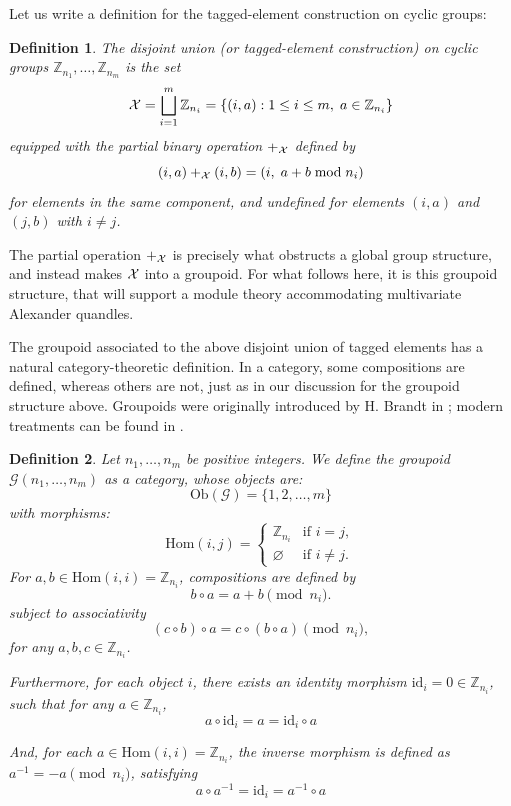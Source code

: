 \documentclass[a4paper,12pt]{article}
\newtheorem{definition}{Definition}[section]
\newcommand{\Z}{\mathbb{Z}}
\newcommand{\calG}{\mathcal{G}}
\newcommand{\Ob}{\mathrm{Ob}}
\newcommand{\Hom}{\mathrm{Hom}}
\begin{document}
Let us write a definition for the tagged-element construction on cyclic groups:   
\begin{definition}
The \emph{disjoint union} (or tagged-element construction) on cyclic groups
$\Z_{n_1}, \ldots, \Z_{n_m}$ is the set
\[
  {\cal X} = \bigsqcup_{i=1}^{m} \Z_{n_i} = \{(i,a) : 1 \le i \le m,\; a \in \Z_{n_i}\}
\]
equipped with the partial binary operation $+_{\cal X}$ defined by
\[
  (i,a) +_{\cal X} (i,b) = (i,\; a + b \bmod n_i)
\]
for elements in the same component, and undefined for elements $(i,a)$
and $(j,b)$ with $i \neq j$.
\end{definition}
The partial operation $+_{\cal X}$ is precisely what obstructs a global group structure, and instead makes ${\cal X}$ into a groupoid. For what follows here, it is this groupoid structure, that will support a module theory accommodating  multivariate Alexander quandles.




The groupoid associated to the above disjoint union of tagged elements has a natural category-theoretic definition. In a category, some compositions are defined, whereas others are not, just as in our discussion for the groupoid structure above.  Groupoids were originally introduced by H. Brandt in \cite{brandt1927verallgemeinerung};  modern treatments can be found in \cite{brown1987groups, weinstein1996groupoids, brown2006topology, nlab:groupoid}.

\begin{definition}
\label{defgcygr}
Let $n_1, \ldots, n_m$ be positive integers. We define the \emph{groupoid}  $\calG(n_1, \ldots, n_m)$ as a category, whose objects are:  
\[ \Ob(\calG) = \{1, 2, \ldots, m\}  \]
with morphisms:  
 \[
          \Hom(i,j) =
          \begin{cases}
            \Z_{n_i} & \text{if } i = j, \\
            \varnothing & \text{if } i \neq j.
          \end{cases}
        \]
  For $a, b \in \Hom(i,i) = \Z_{n_i}$,  compositions are defined by
        \[
          b \circ a = a + b \pmod{n_i}.
        \]
 subject to associativity   
        \[
          (c \circ b) \circ a = c \circ (b \circ a) \pmod{n_i},
        \]
     for any $a, b, c \in \Z_{n_i}$.  
     
Furthermore, for each object $i$, there exists an identity morphism  $\mathrm{id}_i = 0 \in \Z_{n_i}$, such that  for any $a \in \Z_{n_i}$,
        \[
          a \circ \mathrm{id}_i =  a =  \mathrm{id}_i \circ a 
        \]

And,  for each $a \in \Hom(i,i) = \Z_{n_i}$, the inverse morphism is defined as 
        $a^{-1} = -a \pmod{n_i}$,  satisfying 
        \[
          a \circ a^{-1} = \mathrm{id}_i = a^{-1} \circ a
        \]    
\end{definition}
\end{document}
